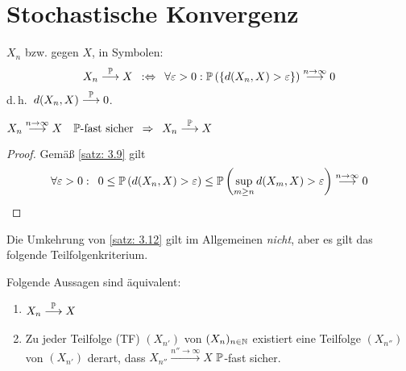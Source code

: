 
\section{Stochastische Konvergenz}

\begin{definition} \label{definition: 3.11}
	$X_n$  bzw.  gegen $X$, in Symbolen:
	\begin{equation*}
		X_n \probto X \defequiv \forall \epsilon > 0:
		\P\brackets{\menge{d(X_n,X) > \epsilon}} \ntoinf 0
	\end{equation*}
	d.\,h.\ $d(X_n, X) \probto 0$.
\end{definition}

\begin{satz} \label{satz: 3.12}
	$\displaystyle X_n \ntoinf X \quad \P\text{-fast sicher} \follows X_n \probto X$
\end{satz}

\begin{proof}
	Gemäß \cref{satz: 3.9} gilt
	\begin{equation*}
		\forall \epsilon > 0 : \enskip 
		0 \le \P\brackets{d(X_n,X) > \epsilon}
		\le \P\brackets{\sup_{m \ge n} d(X_m,X) > \epsilon}
		\ntoinf	0
	\end{equation*}
\end{proof}

Die Umkehrung von \cref{satz: 3.12} gilt im Allgemeinen \textit{nicht}, aber es gilt das folgende Teilfolgenkriterium.

\begin{satz} 
	\label{satz: 3.13}
	Folgende Aussagen sind äquivalent:
	\begin{enumerate}[label=(\arabic*)]
		\item \label{it: 3.13WahrKonv} $\begin{aligned} X_n \probto	X \end{aligned}$
		\item \label{it: 3.13TFfsKonv} Zu jeder Teilfolge (TF) $(X_{n'})$ von $(X_n)_{n \in \N}$ existiert eine Teilfolge $(X_{n''})$ von $(X_{n'})$ derart, dass $X_{n''} \overset{n''\to \infty}{\longrightarrow} X$ $\P$-fast sicher.
	\end{enumerate}
\end{satz}

